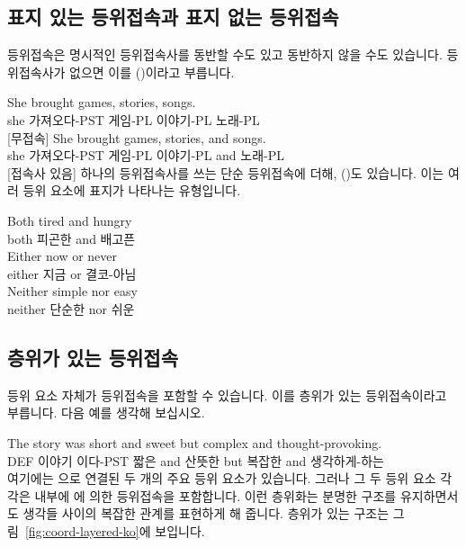 \subsection{표지 있는 등위접속과 표지 없는 등위접속}

등위접속은 명시적인 등위접속사를 동반할 수도 있고 동반하지 않을 수도 있습니다. 등위접속사가 없으면 이를 ()이라고 부릅니다.

\ea \label{ex:coord-marking-ko}
    \ea \gll She brought {\ob}games{\cb}, {\ob}stories{\cb}, {\ob}songs{\cb}.\\
        she 가져오다-PST 게임-PL 이야기-PL 노래-PL\\
    \glt {} [무접속]
    \ex \gll She brought {\ob}games{\cb}, {\ob}stories{\cb}, and {\ob}songs{\cb}.\\
        she 가져오다-PST 게임-PL 이야기-PL and 노래-PL\\
    \glt {} [접속사 있음]
    \z
\z
하나의 등위접속사를 쓰는 단순 등위접속에 더해, ()도 있습니다. 이는 여러 등위 요소에 표지가 나타나는 유형입니다.

\ea \label{ex:coord-correlative-ko}
    \ea \gll {\ob}Both{\cb} tired {\ob}and{\cb} hungry\\
        both 피곤한 and 배고픈\\
    \glt {}
    \ex \gll {\ob}Either{\cb} now {\ob}or{\cb} never\\
        either 지금 or 결코-아님\\
    \glt {}
    \ex \gll {\ob}Neither{\cb} simple {\ob}nor{\cb} easy\\
        neither 단순한 nor 쉬운\\
    \glt {}
    \z
\z

\subsection{층위가 있는 등위접속}

등위 요소 자체가 등위접속을 포함할 수 있습니다. 이를 층위가 있는 등위접속이라고 부릅니다. 다음 예를 생각해 보십시오.

\ea \label{ex:coord-layered-ko}
\gll The story was {\ob}short and sweet{\cb} but {\ob}complex and thought-provoking{\cb}.\\
    DEF 이야기 이다-PST 짧은 and 산뜻한 but 복잡한 and 생각하게-하는\\
\glt {}
\z
여기에는 으로 연결된 두 개의 주요 등위 요소가 있습니다. 그러나 그 두 등위 요소 각각은 내부에 에 의한 등위접속을 포함합니다. 이런 층위화는 분명한 구조를 유지하면서도 생각들 사이의 복잡한 관계를 표현하게 해 줍니다. 층위가 있는 구조는 그림~\ref{fig:coord-layered-ko}에 보입니다.

